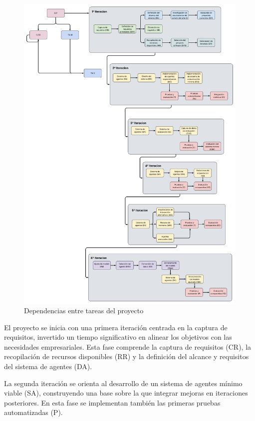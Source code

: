 \begin{figure}[h]
  \centering
  \includegraphics[scale=0.16]{figures/dependencias_2.png}%
  \caption{Dependencias entre tareas del proyecto}
  \label{fig:dependencias}
\end{figure}

El proyecto se inicia con una primera iteración centrada en la captura de requisitos, invertido un tiempo significativo en alinear los objetivos con las necesidades empresariales. Esta fase comprende la captura de requisitos (CR), la recopilación de recursos disponibles (RR) y la definición del alcance y requisitos del sistema de agentes (DA).

La segunda iteración se orienta al desarrollo de un sistema de agentes mínimo viable (SA), construyendo una base sobre la que integrar mejoras en iteraciones posteriores. En esta fase se implementan también las primeras pruebas automatizadas (P).

